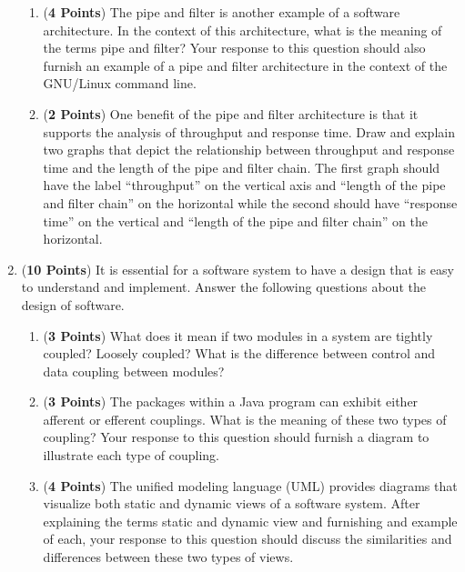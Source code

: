 \documentclass[12pt,epsf,psfig,graphicx]{article}
\begin{document}
\begin{enumerate}
\begin{enumerate}
\item ({\bf 4 Points}) The pipe and filter is another example of a software architecture.  In the context of this
	architecture, what is the meaning of the terms pipe and filter?  Your response to this question should
	also furnish an example of a pipe and filter architecture in the context of the GNU/Linux command line.

\item ({\bf 2 Points}) One benefit of the pipe and filter architecture is that it supports the analysis of throughput
	and response time.  Draw and explain two graphs that depict the relationship between throughput and 	response
	time and the length of the pipe and filter chain.  The first graph should have the label ``throughput'' on the
	vertical axis and ``length of the pipe and filter chain'' on the horizontal while the second should have ``response
	time'' on the vertical and ``length of the pipe and filter chain'' on the horizontal.

\end{enumerate}

\newpage


\item ({\bf 10 Points}) It is essential for a software system to have a design that is easy to understand and implement.
	Answer the following questions about the design of software.

\begin{enumerate}

\item ({\bf 3 Points}) What does it mean if two modules in a system are tightly coupled? Loosely coupled? What is the
	difference between control and data coupling between modules?

% 
% 

\item ({\bf 3 Points}) The packages within a Java program can exhibit either afferent or efferent couplings.  What is
	the meaning of these two types of coupling? Your response to this question should furnish a diagram to illustrate
	each type of coupling.   

\item ({\bf 4 Points}) The unified modeling language (UML) provides diagrams that visualize both static and dynamic
	views of a software system.  After explaining the terms static and dynamic view and furnishing and example of each,
	your response to this question should discuss the similarities and differences between these two types of views.


\end{enumerate}
\end{enumerate}
\end{document}
